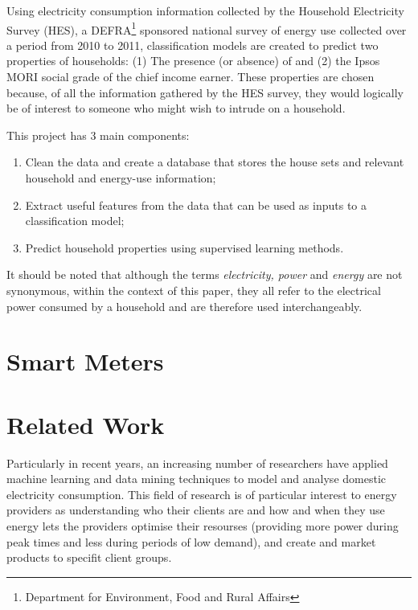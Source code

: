 Using electricity consumption information collected by the Household Electricity Survey (HES), a DEFRA\footnote{Department for Environment, Food and Rural Affairs} sponsored national survey of energy use collected over a period from 2010 to 2011, classification models are created to predict two properties of households: (1) The presence (or absence) of and (2) the Ipsos MORI social grade of the chief income earner. These properties are chosen because, of all the information gathered by the HES survey, they would logically be of interest to someone who might wish to intrude on a household.
\newline

This project has 3 main components:

\begin{enumerate}
\item Clean the data and create a database that stores the house sets and relevant household and energy-use information;
\item Extract useful features from the data that can be used as inputs to a classification model; 
\item Predict household properties using supervised learning methods.
\end{enumerate}

It should be noted that although the terms \textit{electricity, power} and \textit{energy} are not synonymous, within the context of this paper, they all refer to the electrical power consumed by a household and are therefore used interchangeably. 


\section{Smart Meters}
\section{Related Work}
Particularly in recent years, an increasing number of researchers have applied machine learning and data mining techniques to  model and analyse domestic electricity consumption. This field of research is of particular interest to energy providers as understanding who their clients are and how and when they use energy lets the providers optimise their resourses (providing more power during peak times and less during periods of low demand), and create and market products to specifit client groups. 


